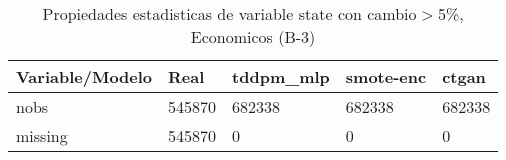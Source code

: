 \begin{table}[H]
\centering
\fontsize{8}{14}\selectfont
\caption{Propiedades estadisticas de variable state con cambio\ensuremath{>}5\%, Economicos (B-3)}
\label{table-stats-economicos-b-3-state-short}
\begin{tabular}{|l|m{10em}|m{10em}|m{10em}|m{10em}|}
\hline
 \rowcolor[gray]{0.8}
Variable/Modelo & Real & tddpm\_mlp & smote-enc & ctgan \\
\hline nobs & 545870 & 682338 & 682338 & 682338 \\
\hline missing & 545870 & 0 & 0 & 0 \\
\hline
\end{tabular}
\end{table}
